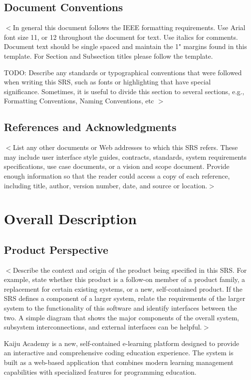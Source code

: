 \documentclass[a4paper, 11pt]{scrreprt}
\begin{document}
\section{Document Conventions}
$<$In general this document follows the IEEE formatting requirements. Use Arial font size 11, or 12 throughout the document for text. Use italics for comments. Document text should be single spaced and maintain the 1" margins found in this template. For Section and Subsection titles please follow the template. 

TODO: Describe any standards or typographical conventions that were followed when writing this SRS, such as fonts or highlighting that have special significance. Sometimes, it is useful to divide this section to several sections, e.g., Formatting Conventions, Naming Conventions, etc
$>$

\section{References and Acknowledgments}
$<$List any other documents or Web addresses to which this SRS refers. These may 
include user interface style guides, contracts, standards, system requirements 
specifications, use case documents, or a vision and scope document. Provide 
enough information so that the reader could access a copy of each reference, 
including title, author, version number, date, and source or location.$>$

\chapter{Overall Description}

\section{Product Perspective}
$<$Describe the context and origin of the product being specified in this SRS.  
For example, state whether this product is a follow-on member of a product 
family, a replacement for certain existing systems, or a new, self-contained 
product. If the SRS defines a component of a larger system, relate the 
requirements of the larger system to the functionality of this software and 
identify interfaces between the two. A simple diagram that shows the major 
components of the overall system, subsystem interconnections, and external 
interfaces can be helpful.$>$

Kaiju Academy is a new, self-contained e-learning platform designed to provide an interactive and comprehensive coding education experience. The system is built as a web-based application that combines modern learning management capabilities with specialized features for programming education.
\end{document}
